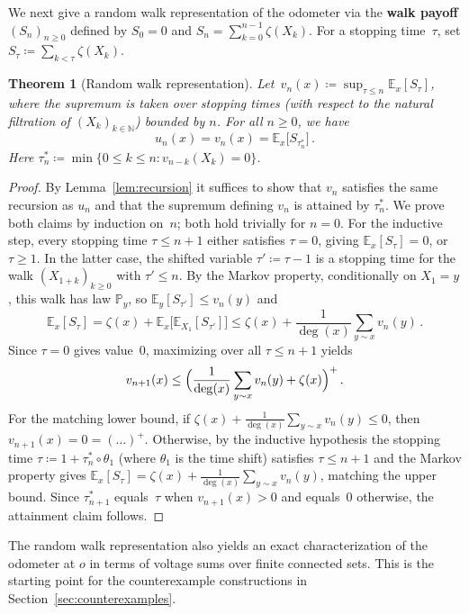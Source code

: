 \documentclass[aop]{imsart}
\theoremstyle{plain}
\newtheorem{theorem}{Theorem}[section]
\theoremstyle{definition}
\newcommand{\N}{\mathbb{N}}
\newcommand{\E}{\mathbb{E}}
\renewcommand{\P}{\mathbb{P}}
\begin{document}
	We next give a random walk representation of the odometer via the \textbf{walk payoff} $(S_n)_{n\geq 0}$ defined by $S_0=0$ and $S_n=\sum_{k=0}^{n-1}\zeta(X_k)$.
	For a stopping time~$\tau$, set $S_\tau\coloneqq\sum_{k<\tau}\zeta(X_k)$.
	\begin{theorem}[Random walk representation]\label{thm:RW}
		Let~$v_n(x) \coloneqq \sup_{\tau \leq n} \E_x[S_\tau]$, where the supremum is taken over stopping times (with respect to the natural filtration of $(X_k)_{k\in\N}$) bounded by $n$.
		For all $n \geq 0$, we have
		\[
		u_n(x) = v_n(x) = \E_x\bigl[S_{\tau_n^*}\bigr]\,.
		\]
		Here $\tau_n^* \coloneqq \min\bigl\{0 \leq k \leq n : v_{n-k}(X_k) = 0\bigr\}$.
	\end{theorem}
	\begin{proof}
		By Lemma~\ref{lem:recursion} it suffices to show that $v_n$ satisfies the same recursion as $u_n$ and that the supremum defining $v_n$ is attained by $\tau_n^*$. We prove both claims by induction on~$n$; both hold trivially for $n = 0$.
		For the inductive step, every stopping time $\tau \leq n+1$ either satisfies $\tau = 0$, giving $\E_x[S_\tau] = 0$, or $\tau \geq 1$. In the latter case, the shifted variable $\tau' \coloneqq \tau - 1$ is a stopping time for the walk $(X_{1+k})_{k \geq 0}$ with $\tau' \leq n$. By the Markov property, conditionally on $X_1 = y$, this walk has law $\P_y$, so $\E_y[S_{\tau'}] \leq v_n(y)$ and
		\[
		\E_x[S_\tau] = \zeta(x) + \E_x\bigl[\E_{X_1}[S_{\tau'}]\bigr] \leq \zeta(x) + \frac{1}{\deg(x)}\sum_{y \sim x} v_n(y)\,.
		\]
		Since $\tau = 0$ gives value~$0$, maximizing over all $\tau \leq n+1$ yields
		\[
		v_{n+1}(x) \leq \Bigl(\frac{1}{\deg(x)}\sum_{y \sim x} v_n(y) + \zeta(x)\Bigr)^+\,.
		\]
		For the matching lower bound, if $\zeta(x) + \frac{1}{\deg(x)}\sum_{y \sim x} v_n(y) \leq 0$, then $v_{n+1}(x)=0=(\ldots)^+$. Otherwise, by the inductive hypothesis the stopping time $\tau\coloneqq 1+\tau_n^*\circ\theta_1$ (where $\theta_1$ is the time shift) satisfies $\tau\leq n+1$ and the Markov property gives $\E_x[S_\tau] = \zeta(x) + \frac{1}{\deg(x)}\sum_{y \sim x} v_n(y)$, matching the upper bound. Since $\tau_{n+1}^*$ equals~$\tau$ when $v_{n+1}(x)>0$ and equals~$0$ otherwise, the attainment claim follows.
	\end{proof}
	
	
	The random walk representation also yields an exact characterization of the odometer at $o$ in terms of voltage sums over finite connected sets. This is the starting point for the counterexample constructions in Section~\ref{sec:counterexamples}.
	
\end{document}
